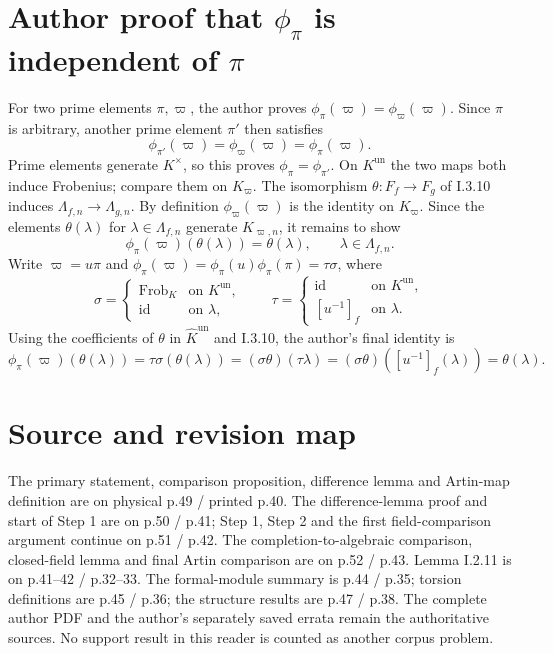 \documentclass[11pt]{article}
\newcommand{\un}{\mathrm{un}}
\newcommand{\Frob}{\operatorname{Frob}}
\newcommand{\Khat}{\widehat K^{\un}}
\begin{document}
\section*{Author proof that $\phi_\pi$ is independent of $\pi$}
For two prime elements $\pi,\varpi$, the author proves
$\phi_\pi(\varpi)=\phi_\varpi(\varpi)$.
Since $\pi$ is arbitrary, another prime element $\pi'$ then satisfies
\[
 \phi_{\pi'}(\varpi)=\phi_\varpi(\varpi)=\phi_\pi(\varpi).
\]
Prime elements generate $K^\times$, so this proves $\phi_\pi=\phi_{\pi'}$.
On $K^{\un}$ the two maps both induce Frobenius; compare them on $K_\varpi$.
The isomorphism $\theta:F_f\to F_g$ of I.3.10 induces
$\Lambda_{f,n}\to\Lambda_{g,n}$. By definition $\phi_\varpi(\varpi)$ is the identity
on $K_\varpi$. Since the elements $\theta(\lambda)$ for $\lambda\in\Lambda_{f,n}$
generate $K_{\varpi,n}$, it remains to show
\[
 \phi_\pi(\varpi)(\theta(\lambda))=\theta(\lambda),\qquad
 \lambda\in\Lambda_{f,n}.
\]
Write $\varpi=u\pi$ and
$\phi_\pi(\varpi)=\phi_\pi(u)\phi_\pi(\pi)=\tau\sigma$, where
\[
 \sigma=\begin{cases}\Frob_K&\text{on }K^{\un},\\\mathrm{id}&\text{on }\lambda,\end{cases}
 \qquad
 \tau=\begin{cases}\mathrm{id}&\text{on }K^{\un},\\{}[u^{-1}]_f&\text{on }\lambda.\end{cases}
\]
Using the coefficients of $\theta$ in $\Khat$ and I.3.10, the author's final identity is
\[
 \phi_\pi(\varpi)(\theta(\lambda))
 =\tau\sigma(\theta(\lambda))
 =(\sigma\theta)(\tau\lambda)
 =(\sigma\theta)([u^{-1}]_f(\lambda))
 =\theta(\lambda).
\]

\section*{Source and revision map}
The primary statement, comparison proposition, difference lemma and Artin-map definition
are on physical p.49 / printed p.40. The difference-lemma proof and start of Step 1 are on
p.50 / p.41; Step 1, Step 2 and the first field-comparison argument continue on
p.51 / p.42. The completion-to-algebraic comparison, closed-field lemma and final Artin
comparison are on p.52 / p.43. Lemma I.2.11 is on p.41--42 / p.32--33.
The formal-module summary is p.44 / p.35; torsion definitions are p.45 / p.36;
the structure results are p.47 / p.38.
The complete author PDF and the author's separately saved errata remain the authoritative
sources. No support result in this reader is counted as another corpus problem.
\end{document}
